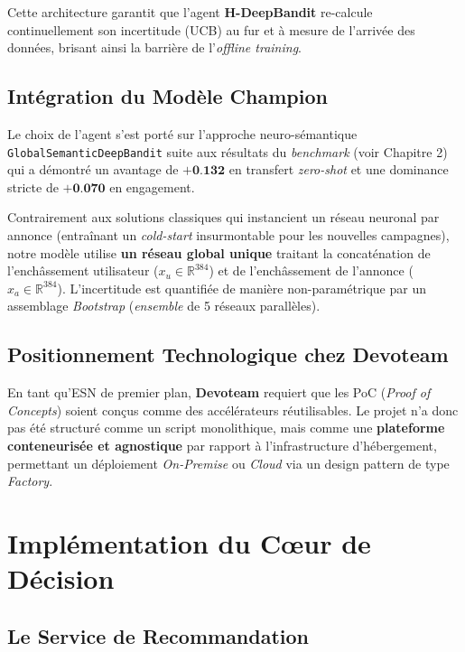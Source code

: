 Cette architecture garantit que l'agent \textbf{H-DeepBandit} re-calcule continuellement son incertitude (UCB) au fur et à mesure de l'arrivée des données, brisant ainsi la barrière de l'\textit{offline training}.

\subsection{Intégration du Modèle Champion}

Le choix de l'agent s'est porté sur l'approche neuro-sémantique \texttt{GlobalSemanticDeepBandit} suite aux résultats du \textit{benchmark} (voir Chapitre 2) qui a démontré un avantage de $+\textbf{0.132}$ en transfert \textit{zero-shot} et une dominance stricte de $+\textbf{0.070}$ en engagement.

Contrairement aux solutions classiques qui instancient un réseau neuronal par annonce (entraînant un \textit{cold-start} insurmontable pour les nouvelles campagnes), notre modèle utilise \textbf{un réseau global unique} traitant la concaténation de l'enchâssement utilisateur ($x_u \in \mathbb{R}^{384}$) et de l'enchâssement de l'annonce ($x_a \in \mathbb{R}^{384}$). L'incertitude est quantifiée de manière non-paramétrique par un assemblage \textit{Bootstrap} (\textit{ensemble} de 5 réseaux parallèles).

\subsection{Positionnement Technologique chez Devoteam}

En tant qu'ESN de premier plan, \textbf{Devoteam} requiert que les PoC (\textit{Proof of Concepts}) soient conçus comme des accélérateurs réutilisables. Le projet n'a donc pas été structuré comme un script monolithique, mais comme une \textbf{plateforme conteneurisée et agnostique} par rapport à l'infrastructure d'hébergement, permettant un déploiement \textit{On-Premise} ou \textit{Cloud} via un design pattern de type \textit{Factory}.


\section{Implémentation du Cœur de Décision}

\subsection{Le Service de Recommandation}

